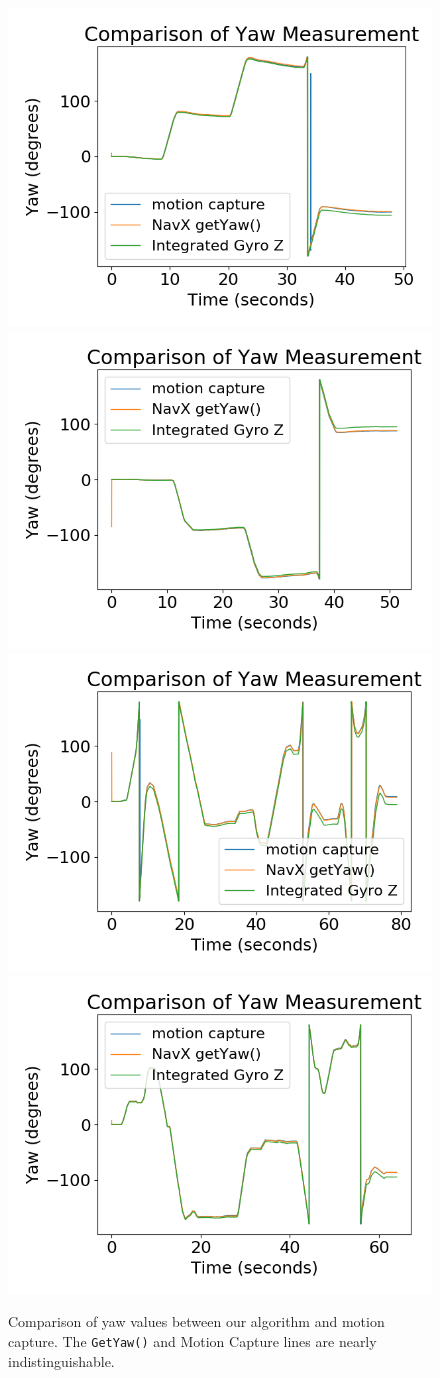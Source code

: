 \documentclass{article}
\begin{document}
    \begin{figure}[H]
      \centering
      \includegraphics[width=0.49\linewidth]{./images/yaw_comparison_2.png}
      \includegraphics[width=0.49\linewidth]{./images/yaw_comparison_3.png}
      \includegraphics[width=0.49\linewidth]{./images/yaw_comparison_4.png}
      \includegraphics[width=0.49\linewidth]{./images/yaw_comparison_5.png}
      \caption{Comparison of yaw values between our algorithm and motion capture. The \texttt{GetYaw()} and Motion Capture lines are nearly indistinguishable.}
      \label{fig:yaw_comparison}
    \end{figure}
\end{document}
